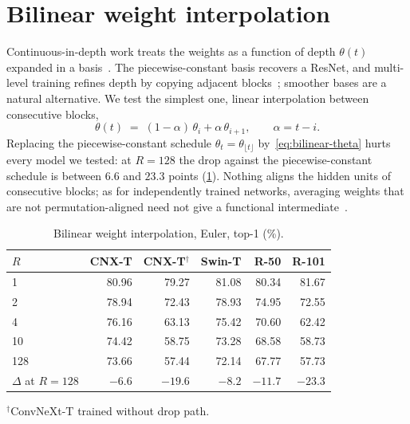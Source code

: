 \section{Bilinear weight interpolation}
\label{app:bilinear}

Continuous-in-depth work treats the weights as a function of depth $\theta(t)$ expanded
in a basis~\citep{queiruga2020continuousindepthneuralnetworks}.
The piecewise-constant basis recovers a ResNet, and multi-level training refines depth
by copying adjacent blocks~\citep{chang2018multilevel}; smoother bases are a natural
alternative.
We test the simplest one, linear interpolation between consecutive blocks,
\begin{equation}
    \theta(t) \;=\; (1-\alpha)\,\theta_i + \alpha\,\theta_{i+1},
    \qquad \alpha = t - i.
    \label{eq:bilinear-theta}
\end{equation}
Replacing the piecewise-constant schedule $\theta_t=\theta_{\lfloor t\rfloor}$ by~\eqref{eq:bilinear-theta}
hurts every model we tested: at $R{=}128$ the drop against the piecewise-constant schedule is between $6.6$ and $23.3$
points (\cref{tab:app-bilinear}).
Nothing aligns the hidden units of consecutive blocks; as for independently trained
networks, averaging weights that are not permutation-aligned need not give a functional
intermediate~\citep{entezari2022permutation,ainsworth2023gitrebasin}.

\begin{table}[t]
    \centering
    \caption{Bilinear weight interpolation, Euler, top-1 (\%).}
    \label{tab:app-bilinear}
    \small
    \setlength{\tabcolsep}{2.8pt}
    \begin{tabular}{lrrrrr}
        \toprule
        $R$ & CNX-T & CNX-T$^{\dagger}$ & Swin-T & R-50 & R-101 \\
        \midrule
        1   & 80.96 & 79.27 & 81.08 & 80.34 & 81.67 \\
        2   & 78.94 & 72.43 & 78.93 & 74.95 & 72.55 \\
        4   & 76.16 & 63.13 & 75.42 & 70.60 & 62.42 \\
        10  & 74.42 & 58.75 & 73.28 & 68.58 & 58.73 \\
        128 & 73.66 & 57.44 & 72.14 & 67.77 & 57.73 \\
        \midrule
        $\Delta$ at $R{=}128$ & $-6.6$ & $-19.6$ & $-8.2$ & $-11.7$ & $-23.3$ \\
        \bottomrule
    \end{tabular}
    \vspace{2pt}
    {\footnotesize $^{\dagger}$ConvNeXt-T trained without drop path.}
\end{table}

